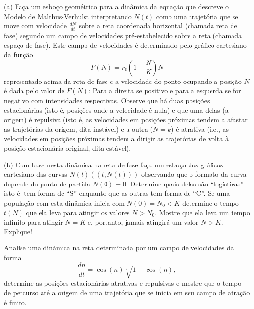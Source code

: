     \begin{exercise}
    \begin{description}
    \item (a) Faça um esboço geométrico para a dinâmica da equação que descreve o Modelo de Malthus-Verhulst interpretando \(N(t)\) como uma trajetória que se move com velocidade \(\frac{dN}{dt}\) sobre a reta coordenada horizontal (chamada reta de fase) segundo um campo de velocidades pré-estabelecido sobre a reta (chamada espaço de fase). Este campo de velocidades é determinado pelo gráfico cartesiano da função \[F(N) = r_0\left(1-\dfrac{N}{K}\right)N\]
    representado acima da reta de fase e a velocidade do ponto ocupando a posição \(N\) é dada pelo valor de \(F(N)\): Para a direita se positivo e para a esquerda se for negativo com intensidades respectivas. Observe que há duas posições estacionárias (isto é, posições onde a velocidade é nula) e que uma delas (a origem) é repulsiva (isto é, as velocidades em posições próximas tendem a afastar as trajetórias da origem, dita instável) e a outra (\(N = k\)) é atrativa (i.e., as velocidades em posições próximas tendem a dirigir as trajetórias de volta à posição estacionária original, dita estável).
    \item (b) Com base nesta dinâmica na reta de fase faça um esboço dos gráficos cartesiano das curvas \(N(t) ( (t, N(t)) )\) observando que o formato da curva depende do ponto de partida \(N(0) = 0\). Determine quais delas são ``logísticas'' isto é, tem forma de ``S'' enquanto que as outras tem forma de ``C''. Se uma população com esta dinâmica inicia com \(N(0) = N_0 < K\) determine o tempo \(t(N)\) que ela leva para atingir os valores \(N > N_0\). Mostre que ela leva um tempo infinito para atingir \(N = K\) e, portanto, jamais atingirá um valor \(N > K\). Explique!
    \item Analise uma dinâmica na reta determinada por um campo de velocidades da forma \[\dfrac{dn}{dt} = \cos(n) \sqrt[4]{1-\cos(n)},\]
    determine as posições estacionárias atrativas e repulsivas e mostre que o tempo de percurso até a origem de uma trajetória que se inicia em seu campo de atração é finito.
    \end{description}
    \end{exercise}

